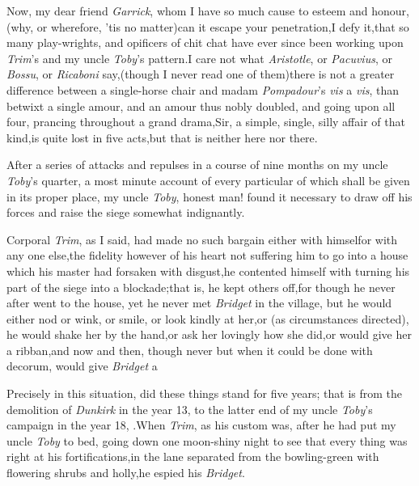 \documentclass{article}
\begin{document}
Now, my dear friend \textit{Garrick}, whom I have so much cause to
esteem and honour,\tsk (why, or wherefore, ’tis no
matter)\tsk can it escape your penetration,\tsk I defy
it,\tsk that so many play-wrights, and
opificers of chit chat have
ever since been working upon \textit{Trim}’s and my uncle
\textit{Toby}’s pattern.\tsh I care not what
\textit{Aristotle}, or \textit{Pacuvius}, or \textit{Bossu}, or
\textit{Ricaboni} say,\tsk (though I never read one of
them)\tsh there is not a greater difference between a
single-horse chair and madam \textit{Pompa\-dour}’s
\textit{vis} a \textit{vis}, than betwixt a single amour, and an amour thus
nobly doubled, and going upon all four, prancing throughout a grand
drama,\tsk Sir, a simple, single, silly affair of that kind,\tsh is
quite lost in five acts,\tsh but that is neither here nor
there.

After a series of attacks and repulses in a course of nine
months on my uncle \textit{Toby}’s quarter, a most minute
account of every particular of which shall be given in its
proper place, my uncle \textit{Toby}, honest man! found it
necessary to draw off his forces and raise the siege somewhat
indignantly.


Corporal \textit{Trim}, as I said, had made no such bargain either with
himself\tsh or with any one else,\tsh the fidelity however of
his heart not suffering him to go into a house which his master had forsaken
with disgust,\tsh he contented himself with turning his part of the
siege into a blockade;\tsk that is, he kept others off,\tsk for though he
never after went to the house, yet he never met \textit{Bridget} in the village,
but he would either nod or wink, or smile, or look kindly at
her,\tsk or (as
circumstances directed), he would shake her by the hand,\tsk or ask her
lovingly how she did,\tsk or would give her a ribban,\tsk and now and then,
though never but when it could be done with decorum, would give \textit{Bridget}
a \tsh{}

Precisely in this situation, did these things stand for five
years; that is from the demolition of \textit{Dunkirk} in the
year 13, to the latter end of my uncle \textit{Toby}’s campaign
in the year 18, .\tsk When \textit{Trim}, as his custom was,
after he had put my uncle \textit{Toby} to bed, going down one
moon-shiny night to see that every thing was right at his
fortifications,\tsh in the lane separated from the bowling-green
with flowering shrubs and holly,\tsk he espied his
\textit{Bridget}.
\end{document}
